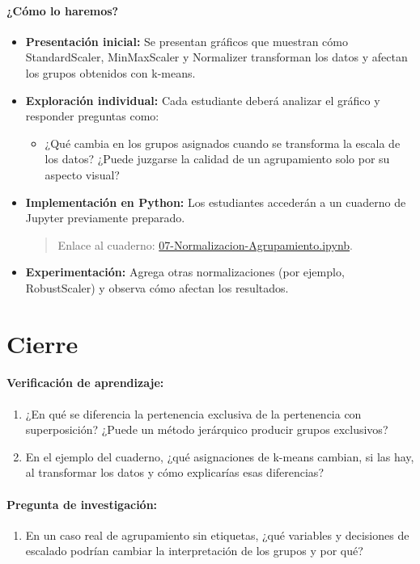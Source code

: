 \documentclass[a4,11pt]{aleph-notas}
\begin{document}
\paragraph{¿Cómo lo haremos?}  
\begin{itemize}[leftmargin=*]
    \item \textbf{Presentación inicial:}  
    Se presentan gráficos que muestran cómo StandardScaler, MinMaxScaler y Normalizer transforman los datos y afectan los grupos obtenidos con k-means.
    
    \item \textbf{Exploración individual:}  
    Cada estudiante deberá analizar el gráfico y responder preguntas como:
    \begin{itemize}
        \item ¿Qué cambia en los grupos asignados cuando se transforma la escala de los datos? ¿Puede juzgarse la calidad de un agrupamiento solo por su aspecto visual?
    \end{itemize}
    
    \item \textbf{Implementación en Python:} Los estudiantes accederán a un cuaderno de Jupyter previamente preparado.
    \begin{quote}
        Enlace al cuaderno: \href{https://github.com/andres-merino/AprendizajeAutomaticoInicial-05-N0105/blob/main/2-Notebooks/07-Normalizacion-Agrupamiento.ipynb}{07-Normalizacion-Agrupamiento.ipynb}.
    \end{quote}

    \item \textbf{Experimentación:} Agrega otras normalizaciones (por ejemplo, RobustScaler) y observa cómo afectan los resultados.
    
\end{itemize}

\section*{Cierre}

\paragraph{Verificación de aprendizaje:} 
\begin{enumerate}[leftmargin=*]   
    \item ¿En qué se diferencia la pertenencia exclusiva de la pertenencia con superposición? ¿Puede un método jerárquico producir grupos exclusivos?
    
    \item En el ejemplo del cuaderno, ¿qué asignaciones de k-means cambian, si las hay, al transformar los datos y cómo explicarías esas diferencias?
\end{enumerate}

\paragraph{Pregunta de investigación:}  
\begin{enumerate}[leftmargin=*]
    \item En un caso real de agrupamiento sin etiquetas, ¿qué variables y decisiones de escalado podrían cambiar la interpretación de los grupos y por qué?
\end{enumerate}
\end{document}
